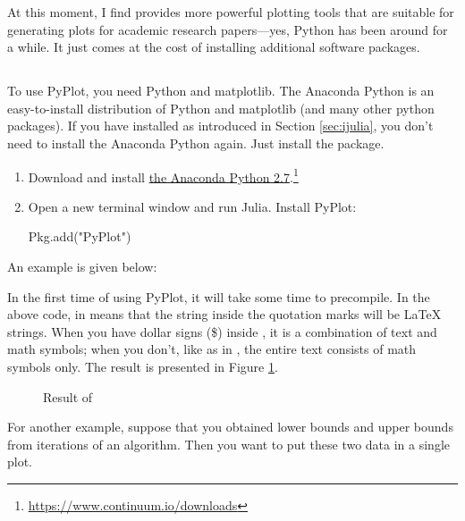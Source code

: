 At this moment, I find  provides more powerful plotting tools that are suitable for generating plots for academic research papers---yes, Python has been around for a while. It just comes at the cost of installing additional software packages.

\subsection{} \label{sec:pyplot}

To use PyPlot, you need Python and matplotlib. The Anaconda Python is an easy-to-install distribution of Python and matplotlib (and many other python packages). If you have installed  as introduced in Section \ref{sec:ijulia}, you don't need to install the Anaconda Python again. Just install the  package.

\begin{enumerate}
\item Download and install \href{https://www.continuum.io/downloads}{the Anaconda Python 2.7}.\footnote{\url{https://www.continuum.io/downloads}}
\item Open a new terminal window and run Julia. Install PyPlot:
\begin{code}
Pkg.add("PyPlot")
\end{code}
\end{enumerate}


An example is given below:
\begin{codelisting}
\end{codelisting}

In the first time of using PyPlot, it will take some time to precompile. In the above code,  in  means that the string inside the quotation marks will be \LaTeX{} strings. When you have dollar signs (\$) inside , it is a combination of text and math symbols; when you don't, like as in , the entire text consists of math symbols only. The result is presented in Figure \ref{fig:myplot1}.

\begin{figure}
\caption{Result of  \label{fig:myplot1}}
\end{figure}

For another example, suppose that you obtained lower bounds and upper bounds from iterations of an algorithm. Then you want to put these two data in a single plot.
\begin{codelisting}
\end{codelisting}

